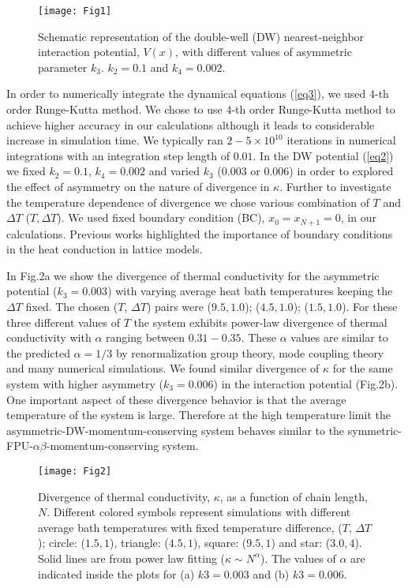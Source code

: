 \documentclass[aps,pre,reprint,groupedaddress]{revtex4-1}
\begin{document}
\begin{figure}
	\centering
	\texttt{[image: Fig1]}
	\caption{Schematic representation of the double-well (DW) nearest-neighbor interaction potential, $V(x)$, with different values of asymmetric parameter $k_3$. $k_2=0.1$ and $k_4=0.002$.}
	\label{fig:fig1}
\end{figure}

In order to numerically integrate the dynamical equations (\ref{eq3}), we used 4-th order Runge-Kutta method. We chose to use 4-th order Runge-Kutta method to achieve higher accuracy in our calculations although it leads to considerable increase in simulation time. We typically ran $2-5\times10^{10}$ iterations in numerical integrations with an integration step length of $0.01$. In the DW potential (\ref{eq2}) we fixed $k_2=0.1$, $k_4=0.002$ and varied $k_3$ ($0.003$ or $0.006$) in order to explored the effect of asymmetry on the nature of divergence in $\kappa$. Further to investigate the temperature dependence of divergence we chose various combination of $T$ and $\Delta T$ ($T, \Delta T$). We used fixed boundary condition (BC), $x_0=x_{N+1}=0$, in our calculations. Previous works highlighted the importance of boundary conditions in the heat conduction in lattice models\cite{Das2014,Cividini2017}. 

In Fig.2a we show the divergence of thermal conductivity for the asymmetric potential ($k_3=0.003$) with varying average heat bath temperatures keeping the $\Delta T$ fixed. The chosen ($T$, $\Delta T$) pairs were ($9.5, 1.0$); ($4.5, 1.0$); ($1.5, 1.0$). For these three different values of $T$ the system exhibits power-law divergence of thermal conductivity with $\alpha$ ranging between $0.31-0.35$. These $\alpha$ values are similar to the predicted $\alpha=1/3$ by renormalization group theory, mode coupling theory and many numerical simulations\cite{Narayan2002,Wang2004a,Mai2006,Mai2007,Roy2012a,Delfini2006}. We found similar divergence of $\kappa$ for the same system with higher asymmetry ($k_3=0.006$) in the interaction potential (Fig.2b). One important aspect of these divergence behavior is that the average temperature of the system is large. Therefore at the high temperature limit the asymmetric-DW-momentum-conserving system behaves similar to the symmetric-FPU-$\alpha\beta$-momentum-conserving system. 

\begin{figure}
	\centering
	\texttt{[image: Fig2]}
	\caption{Divergence of thermal conductivity, $\kappa$, as a function of chain length, $N$. Different colored symbols represent simulations with different average bath temperatures with fixed temperature difference, ($T$, $\Delta T$); circle: ($1.5,1$), triangle: ($4.5,1$), square: ($9.5,1$) and star: ($3.0,4$). Solid lines are from power law fitting ($\kappa\sim N^\alpha$). The values of $\alpha$ are indicated inside the plots for (a) $k3=0.003$ and (b) $k3=0.006$.}
	\label{fig:fig2}
\end{figure}
\end{document}

